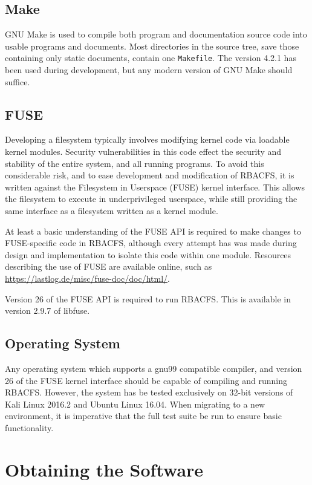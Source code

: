 \documentclass[11pt,oneside,letterpaper]{article}
\begin{document}
\subsection{Make}

GNU Make is used to compile both program and documentation source code into
usable programs and documents. Most directories in the source tree, save those
containing only static documents, contain one {\tt Makefile}. The version 4.2.1
has been used during development, but any modern version of GNU Make should
suffice.

\subsection{FUSE}

Developing a filesystem typically involves modifying kernel code via loadable
kernel modules. Security vulnerabilities in this code effect the security and
stability of the entire system, and all running programs. To avoid this
considerable risk, and to ease development and modification of RBACFS, it
is written against the Filesystem in Userspace (FUSE) kernel interface. This
allows the filesystem to execute in underprivileged userspace, while still
providing the same interface as a filesystem written as a kernel module.

At least a basic understanding of the FUSE API is required to make changes
to FUSE-specific code in RBACFS, although every attempt has was made
during design and implementation to isolate this code within one module.
Resources describing the use of FUSE are available online, such as
\url{https://lastlog.de/misc/fuse-doc/doc/html/}.

Version 26 of the FUSE API is required to run RBACFS. This is available
in version 2.9.7 of libfuse.

\subsection{Operating System}

Any operating system which supports a gnu99 compatible compiler, and version 26
of the FUSE kernel interface should be capable of compiling and running RBACFS.
However, the system has be tested exclusively on 32-bit versions of Kali Linux
2016.2 and Ubuntu Linux 16.04. When migrating to a new environment, it is
imperative that the full test suite be run to ensure basic functionality.

\section{Obtaining the Software}
\label{sec:obtain}
\end{document}
